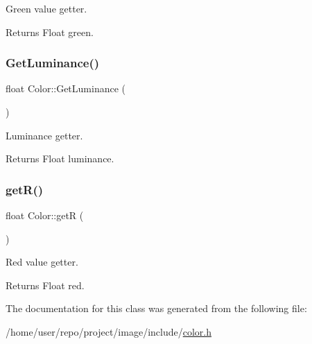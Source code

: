 Green value getter. 

\begin{DoxyReturn}{Returns}
Float green. 
\end{DoxyReturn}
\mbox{\label{classColor_a44b18556e2cc4cd58e3f5f35471262b5}} 
\subsubsection{\texorpdfstring{Get\+Luminance()}{GetLuminance()}}
{\footnotesize\ttfamily float Color\+::\+Get\+Luminance (\begin{DoxyParamCaption}{ }\end{DoxyParamCaption})\hspace{0.3cm}{\ttfamily [inline]}}



Luminance getter. 

\begin{DoxyReturn}{Returns}
Float luminance. 
\end{DoxyReturn}
\mbox{\label{classColor_a65df51367c71b8d2147e1db240e62429}} 
\subsubsection{\texorpdfstring{get\+R()}{getR()}}
{\footnotesize\ttfamily float Color\+::getR (\begin{DoxyParamCaption}{ }\end{DoxyParamCaption})\hspace{0.3cm}{\ttfamily [inline]}}



Red value getter. 

\begin{DoxyReturn}{Returns}
Float red. 
\end{DoxyReturn}


The documentation for this class was generated from the following file\+:\begin{DoxyCompactItemize}
\item 
/home/user/repo/project/image/include/\hyperlink{color_8h}{color.\+h}\end{DoxyCompactItemize}
